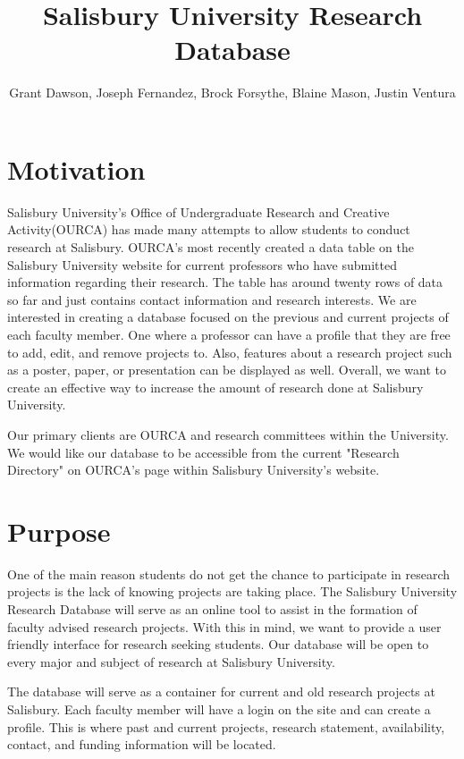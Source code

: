 \documentclass[]{spie}  %
\title{Salisbury University Research Database}
\author{Grant Dawson, Joseph Fernandez, Brock Forsythe, Blaine Mason, Justin Ventura}
\begin{document}
 
\maketitle

\section{Motivation}
Salisbury University's Office of Undergraduate Research and Creative Activity(OURCA) has made many attempts to allow students to conduct research at Salisbury.  OURCA's most recently created a data table on the Salisbury University website for current professors who have submitted information regarding their research.  The table has around twenty rows of data so far and just contains contact information and research interests.  We are interested in creating a database focused on the previous and current projects of each faculty member.  One where a professor can have a profile that they are free to add, edit, and remove projects to.  Also, features about a research project such as a poster, paper, or presentation can be displayed as well. Overall, we want to create an effective way to increase the amount of research done at Salisbury University.

Our primary clients are OURCA and research committees within the University.  We would like our database to be accessible from the current "Research Directory" on OURCA's page within Salisbury University's website.  
\section{Purpose}
One of the main reason students do not get the chance to participate in research projects is the lack of  knowing projects are taking place.  The Salisbury University Research Database will serve as an online tool to assist in the formation of faculty advised research projects. With this in mind, we want to provide a user friendly interface for research seeking students.  Our database will be open to every major and subject of research at Salisbury University.  

The database will serve as a container for current and old research projects at Salisbury.  Each faculty member will have a login on the site and can create a profile. This is where past and current projects, research statement, availability, contact, and funding information will be located.
\newpage
\end{document}
